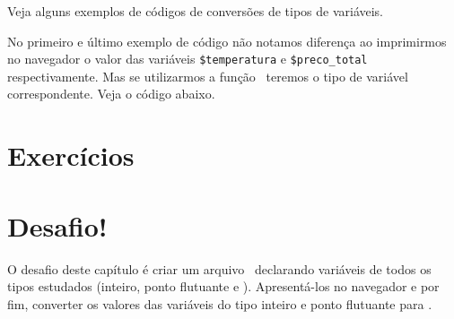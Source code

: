 

Veja alguns exemplos de códigos de conversões de tipos de variáveis.



No primeiro e último exemplo de código não notamos diferença ao imprimirmos no navegador 
o valor das variáveis \texttt{\$temperatura} e \texttt{\$preco\_total} respectivamente. 
Mas se utilizarmos a função \funcaogettype~teremos o tipo de variável correspondente. Veja
o código abaixo.



\section{Exercícios}
\label{cap3-exercicios}


\section{Desafio!}
\label{cap3-desafio}
O desafio deste capítulo é criar um arquivo \phpextensao~declarando variáveis de todos os tipos
estudados (inteiro, ponto flutuante e \tipostring). Apresentá-los no navegador e por fim, converter
os valores das variáveis do tipo inteiro e ponto flutuante para \tipostring.
